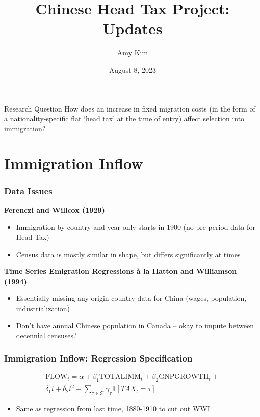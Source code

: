 \documentclass[pdf]{beamer}
\title{Chinese Head Tax Project: Updates}
\author{Amy Kim}
\date{August 8, 2023}
\begin{document}
\begin{frame}[plain]
    \titlepage
\end{frame}

\begin{frame}{Research Question}
    How does an increase in fixed migration costs (in the form of a nationality-specific flat `head tax' at the time of entry) affect selection into immigration?
\end{frame}

\section{Immigration Inflow}
\begin{frame}[label = data1]
    \frametitle{Data Issues}
    \textbf{Ferenczi and Willcox (1929)}
    \begin{itemize}
        \item Immigration by country and year only starts in 1900 (no pre-period data for Head Tax)
        \item Census data is mostly similar in shape, but differs significantly at times \hyperlink{flow_compar_all}{} \hyperlink{flow_compar_belgium}{}  \hyperlink{flow_compar_japan}{}
    \end{itemize}
    \textbf{Time Series Emigration Regressions à la Hatton and Williamson (1994)}
    \begin{itemize}
        \item Essentially missing any origin country data for China (wages, population, industrialization)
        \item Don't have annual Chinese population in Canada -- okay to impute between decennial censuses?
    \end{itemize}
\end{frame}

\begin{frame}[label = flow_reg]
    \frametitle{Immigration Inflow: Regression Specification}
    \begin{multline}
        \text{FLOW}_t = \alpha + \beta_1\text{TOTALIMM}_t + \beta_2\text{GNPGROWTH}_t +  \\ \delta_1 t + \delta_2 t^2 + \sum_{\tau \in \mathcal{T}} \gamma_\tau \mathbf{1}[TAX_t = \tau] 
    \end{multline}
    \begin{itemize}
        \item Same as regression from last time, 1880-1910 to cut out WWI
    \end{itemize}
\end{frame}
\end{document}
